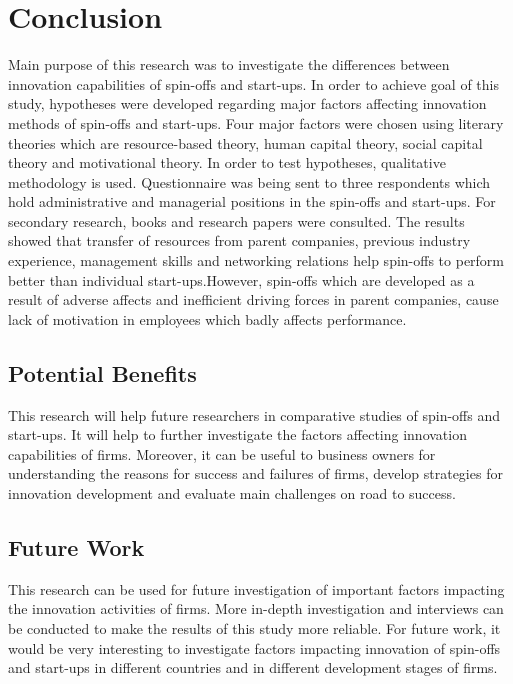 \chapter{Conclusion\label{cha:chapter6}}
Main purpose of this research was to investigate the differences between innovation capabilities of
spin-offs and start-ups. In order to achieve goal of this study, hypotheses were developed regarding
major factors affecting innovation methods of spin-offs and start-ups. Four major factors were
chosen using literary theories which are resource-based theory, human capital theory, social capital
theory and motivational theory. In order to test hypotheses, qualitative methodology is used.
Questionnaire was being sent to three respondents which hold administrative and managerial positions in the
spin-offs and start-ups. For secondary research, books and research papers were consulted. The
results showed that transfer of resources from parent companies, previous industry experience,
management skills and networking relations help spin-offs to perform better than individual start-ups.However, spin-offs which are developed as a result of adverse affects and inefficient driving
forces in parent companies, cause lack of motivation in employees which badly affects
performance.

\section{Potential Benefits}
This research will help future researchers in comparative studies of spin-offs and
start-ups. It will help to further investigate the factors affecting innovation capabilities of firms.
Moreover, it can be useful to business owners for understanding the reasons for success and failures
of firms, develop strategies for innovation development and evaluate main
challenges on road to success.
\section{Future Work}
This research can be used for future investigation of important factors impacting
the innovation activities of firms. More in-depth investigation and interviews can be conducted
to make the results of this study more reliable. For future work, it would be very interesting to investigate
factors impacting innovation of spin-offs and start-ups in different countries and in different development stages
of firms.
